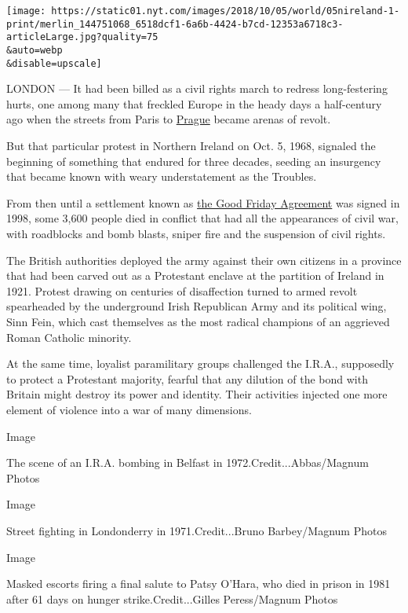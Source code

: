 \texttt{[image: https://static01.nyt.com/images/2018/10/05/world/05nireland-1-print/merlin\_144751068\_6518dcf1-6a6b-4424-b7cd-12353a6718c3-articleLarge.jpg?quality=75\\\&auto=webp\\\&disable=upscale]}

LONDON --- It had been billed as a civil rights march to redress
long-festering hurts, one among many that freckled Europe in the heady
days a half-century ago when the streets from Paris to
\href{https://www.nytimes.com/2018/08/20/world/europe/prague-spring-communism.html}{Prague}
became arenas of revolt.

But that particular protest in Northern Ireland on Oct. 5, 1968,
signaled the beginning of something that endured for three decades,
seeding an insurgency that became known with weary understatement as the
Troubles.

From then until a settlement known as
\href{https://www.nytimes.com/1998/04/11/world/irish-accord-overview-irish-talks-produce-accord-stop-decades-bloodshed-with.html}{the
Good Friday Agreement} was signed in 1998, some 3,600 people died in
conflict that had all the appearances of civil war, with roadblocks and
bomb blasts, sniper fire and the suspension of civil rights.

The British authorities deployed the army against their own citizens in
a province that had been carved out as a Protestant enclave at the
partition of Ireland in 1921. Protest drawing on centuries of
disaffection turned to armed revolt spearheaded by the underground Irish
Republican Army and its political wing, Sinn Fein, which cast themselves
as the most radical champions of an aggrieved Roman Catholic minority.

At the same time, loyalist paramilitary groups challenged the I.R.A.,
supposedly to protect a Protestant majority, fearful that any dilution
of the bond with Britain might destroy its power and identity. Their
activities injected one more element of violence into a war of many
dimensions.

Image

The scene of an I.R.A. bombing in Belfast in 1972.Credit...Abbas/Magnum
Photos

Image

Street fighting in Londonderry in 1971.Credit...Bruno Barbey/Magnum
Photos

Image

Masked escorts firing a final salute to Patsy O'Hara, who died in prison
in 1981 after 61 days on hunger strike.Credit...Gilles Peress/Magnum
Photos

